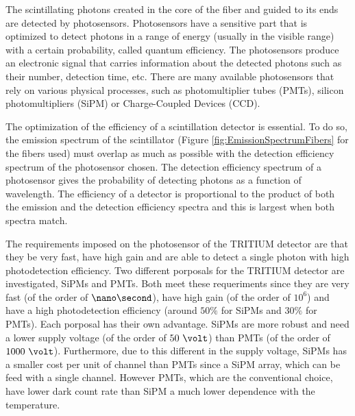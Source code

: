 The scintillating photons created in the core of the fiber and guided to its ends are detected by photosensors. Photosensors have a sensitive part that is optimized to detect photons in a range of energy (usually in the visible range) with a certain probability, called quantum efficiency. The photosensors produce an electronic signal that carries information about the detected photons such as their number, detection time, etc. There are many available photosensors that rely on various physical processes, such as photomultiplier tubes (PMTs), silicon photomultipliers (SiPM) or Charge-Coupled Devices (CCD).  %

The optimization of the efficiency of a scintillation detector is essential. To do so, the emission spectrum of the scintillator (Figure \ref{fig:EmissionSpectrumFibers} for the fibers used) must overlap as much as possible with the detection efficiency spectrum of the photosensor chosen. The detection efficiency spectrum of a photosensor gives the probability of detecting photons as a function of wavelength. The efficiency of a detector is proportional to the product of both the emission and the detection efficiency spectra and this is largest when both spectra match.

The requirements imposed on the photosensor of the TRITIUM detector are that they be very fast, have high gain and are able to detect a single photon with high photodetection efficiency. Two different porposals for the TRITIUM detector are investigated, SiPMs and PMTs. Both meet these requeriments since they are very fast (of the order of $\nano\second$), have high gain (of the order of $10^{6}$) and have a high photodetection efficiency (around $50\%$ for SiPMs and $30\%$ for PMTs). Each porposal has their own advantage. SiPMs are more robust and need a lower supply voltage (of the order of $50~\volt$) than PMTs (of the order of $1000~\volt$). Furthermore, due to this different in the supply voltage, SiPMs has a smaller cost per unit of channel than PMTs since a SiPM array, which can be feed with a single channel. However PMTs, which are the conventional choice, have lower dark count rate than SiPM a much lower dependence with the temperature.




